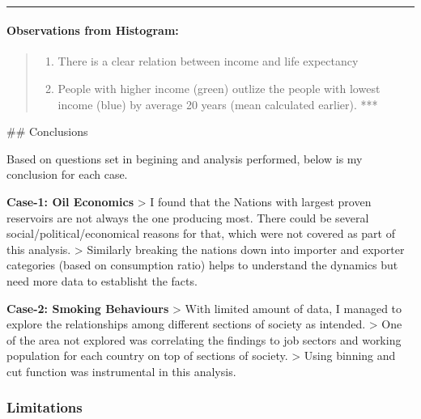 \documentclass[11pt]{article}
\providecommand{\tightlist}{%
      \setlength{\itemsep}{0pt}\setlength{\parskip}{0pt}}
\begin{document}
    \begin{center}
    \end{center}
    { \hspace*{\fill} \\}
    
    \begin{center}\rule{0.5\linewidth}{\linethickness}\end{center}

\paragraph{Observations from
Histogram:}\label{observations-from-histogram}

\begin{quote}
\begin{enumerate}
\def\labelenumi{\roman{enumi}.}
\tightlist
\item
  There is a clear relation between income and life expectancy 
\item
  People with higher income (green) outlize the people with lowest
  income (blue) by average 20 years (mean calculated earlier). ***
\end{enumerate}
\end{quote}

     \#\# Conclusions

Based on questions set in begining and analysis performed, below is my
conclusion for each case.

\textbf{Case-1: Oil Economics} \textgreater{} I found that the Nations
with largest proven reservoirs are not always the one producing most.
There could be several social/political/economical reasons for that,
which were not covered as part of this analysis. \textgreater{}
Similarly breaking the nations down into importer and exporter
categories (based on consumption ratio) helps to understand the dynamics
but need more data to establisht the facts.

\textbf{Case-2: Smoking Behaviours} \textgreater{} With limited amount
of data, I managed to explore the relationships among different sections
of society as intended. \textgreater{} One of the area not explored was
correlating the findings to job sectors and working population for each
country on top of sections of society. \textgreater{} Using binning and
cut function was instrumental in this analysis.

\subsubsection{Limitations}\label{limitations}
\end{document}

